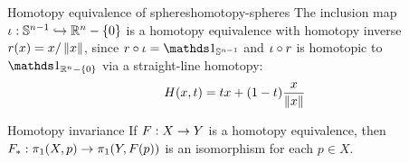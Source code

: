 \begin{example}{Homotopy equivalence of spheres}{homotopy-spheres}
  The inclusion map $ \iota : \mathbb{S}^{n-1} \hookrightarrow \mathbb{R}^n - \{0\} $ is a homotopy equivalence with homotopy inverse $ r(x) = x / \left\lVert x\right\rVert $, since $ r \circ \inc = \id_{\Sn{n-1}} $ and $ \iota \circ r $ is homotopic to $ \id_{\R^n - \{0\}} $ via a straight-line homotopy:
  \begin{equation*}
    H(x,t) = t x + (1 - t) \frac{x}{\left\lVert x\right\rVert}
  \end{equation*}
\end{example}

\begin{theorem}{Homotopy invariance}{}
  If $ F : X \rightarrow Y $ is a homotopy equivalence, then $ F_* : \pi_1(X,p) \rightarrow \pi_1(Y,F(p)) $ is an isomorphism for each $ p \in X $.
\end{theorem}











